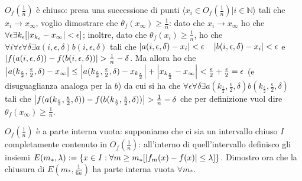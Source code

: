 $O_f(\frac{1}{n})$ è chiuso: presa una successione di punti $\langle x_i\in O_f(\frac{1}{n}) | i\in \mathbb N\rangle$ tali che $x_i\rightarrow x_\infty$, voglio dimostrare che $\theta_f(x_\infty)\ge\frac{1}{n}$: dato che $x_i\rightarrow x_\infty$ ho che $\forall\epsilon\exists k_\epsilon [\left|x_{k_\epsilon}-x_\infty\right|<\epsilon]$; inoltre, dato che $\theta_f(x_i)\ge\frac{1}{n}$, ho che $\forall i\forall\epsilon\forall\delta\exists a(i,\epsilon,\delta)b(i,\epsilon,\delta)$ tali che $\left|a(i,\epsilon,\delta)-x_i\right|<\epsilon \quad \left|b(i,\epsilon,\delta)-x_i\right|<\epsilon$ e $\abs{f(a(i,\epsilon,\delta))-f(b(i,\epsilon,\delta))}>\frac{1}{n}-\delta$. Ma allora ho che $\left|a(k_\frac{\epsilon}{2},\frac{\epsilon}{2},\delta)-x_\infty\right|\le\left|a(k_\frac{\epsilon}{2},\frac{\epsilon}{2},\delta)-x_{k_{\frac{\epsilon}{2}}}\right|+\left|x_{k_{\frac{\epsilon}{2}}}-x_\infty\right|<\frac{\epsilon}{2}+\frac{\epsilon}{2}=\epsilon$ (e disuguaglianza analoga per la $b$) da cui si ha che $\forall\epsilon\forall\delta\exists a(k_\frac{\epsilon}{2},\frac{\epsilon}{2},\delta) b(k_\frac{\epsilon}{2},\frac{\epsilon}{2},\delta)$ tali che $\abs{f(a(k_\frac{\epsilon}{2},\frac{\epsilon}{2},\delta))-f(b(k_\frac{\epsilon}{2},\frac{\epsilon}{2},\delta))}>\frac{1}{n}-\delta$ che per definizione vuol dire $\theta_f(x_\infty)\ge\frac{1}{n}$.

$O_f(\frac{1}{n})$ è a parte interna vuota: supponiamo che ci sia un intervallo chiuso $I$ completamente contenuto in $O_f(\frac{1}{n})$: all'interno di quell'intervallo definisco gli insiemi $E(m_*,\lambda):=\{x\in I : \forall m\ge m_*[\left|f_m(x)-f(x)\right|\le\lambda]\}$. Dimostro ora che la chiusura di $E(m_*,\frac{1}{6n})$ ha parte interna vuota $\forall m_*$.

